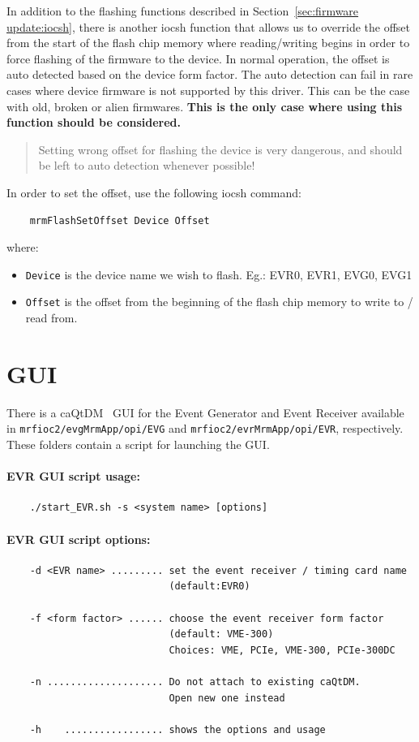 \documentclass[12pt,a4paper]{article}
\let\stdsection\section
\renewcommand\section{\newpage\stdsection}
\begin{document}
In addition to the flashing functions described in Section~\ref{sec:firmware update:iocsh}, there is another iocsh function that allows us to override the offset from the start of the flash chip memory where reading/writing begins in order to force flashing of the firmware to the device. In normal operation, the offset is auto detected based on the device form factor. The auto detection can fail in rare cases where device firmware is not supported by this driver. This can be the case with old, broken or alien firmwares. \textbf{This is the only case where using this function should be considered.}
\begin{quote}
Setting wrong offset for flashing the device is very dangerous, and should be left to auto detection whenever possible!
\end{quote}
In order to set the offset, use the following iocsh command:
\begin{verbatim}
	mrmFlashSetOffset Device Offset
\end{verbatim}
where:
\begin{itemize}
	\item \texttt{Device} is the device name we wish to flash. Eg.: EVR0, EVR1, EVG0, EVG1
	\item \texttt{Offset} is the offset from the beginning of the flash chip memory to write to / read from.
\end{itemize}


\section{GUI}\label{sec:GUI}
There is a caQtDM~\cite{caqtdm} GUI for the Event Generator and Event Receiver available in \texttt{mrfioc2/evgMrmApp/opi/EVG} and \texttt{mrfioc2/evrMrmApp/opi/EVR}, respectively. These folders contain a script for launching the GUI.

\paragraph{EVR GUI script usage:}
\begin{verbatim}
	./start_EVR.sh -s <system name> [options]
\end{verbatim}


\paragraph{EVR GUI script options:}
\begin{verbatim}
	-d <EVR name> ......... set the event receiver / timing card name 
	                        (default:EVR0)
	
	-f <form factor> ...... choose the event receiver form factor 
	                        (default: VME-300)
	                        Choices: VME, PCIe, VME-300, PCIe-300DC
	
	-n .................... Do not attach to existing caQtDM. 
	                        Open new one instead
		
	-h    ................. shows the options and usage
\end{verbatim}
\end{document}
